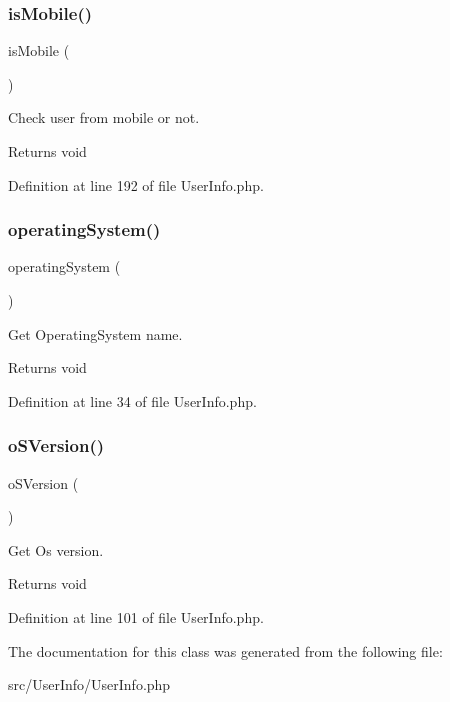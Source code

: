 \subsubsection{\texorpdfstring{is\+Mobile()}{isMobile()}}
{\footnotesize\ttfamily is\+Mobile (\begin{DoxyParamCaption}{ }\end{DoxyParamCaption})}

Check user from mobile or not.

\begin{DoxyReturn}{Returns}
void 
\end{DoxyReturn}


Definition at line 192 of file User\+Info.\+php.

\mbox{\label{class_zest_1_1_user_info_1_1_user_info_aeba63cc8a47f81d0bf55be43b83b3ea8}} 
\subsubsection{\texorpdfstring{operating\+System()}{operatingSystem()}}
{\footnotesize\ttfamily operating\+System (\begin{DoxyParamCaption}{ }\end{DoxyParamCaption})}

Get Operating\+System name.

\begin{DoxyReturn}{Returns}
void 
\end{DoxyReturn}


Definition at line 34 of file User\+Info.\+php.

\mbox{\label{class_zest_1_1_user_info_1_1_user_info_ac9247d3d47b420d84e7b8fdb0f074378}} 
\subsubsection{\texorpdfstring{o\+S\+Version()}{oSVersion()}}
{\footnotesize\ttfamily o\+S\+Version (\begin{DoxyParamCaption}{ }\end{DoxyParamCaption})}

Get Os version.

\begin{DoxyReturn}{Returns}
void 
\end{DoxyReturn}


Definition at line 101 of file User\+Info.\+php.



The documentation for this class was generated from the following file\+:\begin{DoxyCompactItemize}
\item 
src/\+User\+Info/User\+Info.\+php\end{DoxyCompactItemize}
